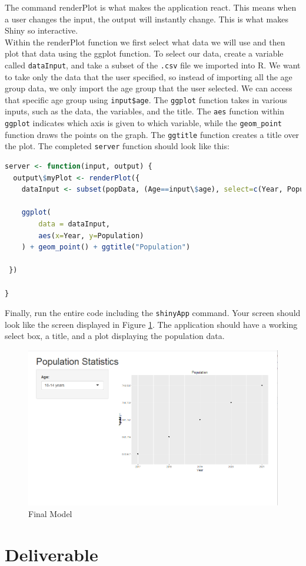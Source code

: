 The command renderPlot is what makes the application react.
This means when a user changes the input, the output will instantly change. This is what makes Shiny so interactive.\\
Within the renderPlot function we first select what data we will use and then plot that data using the ggplot function.
To select our data, create a variable called \texttt{dataInput}, and take a subset of the \texttt{.csv} file we imported into R.
We want to take only the data that the user specified, so instead of importing all the age group data, we only import the age group that the user selected.
We can access that specific age group using \texttt{input\$age}.
The \texttt{ggplot} function takes in various inputs, such as the data, the variables, and the title.
The \texttt{aes} function within \texttt{ggplot} indicates which axis is given to which variable, while the \texttt{geom\_point} function draws the points on the graph.
The \texttt{ggtitle} function creates a title over the plot.
The completed \texttt{server} function should look like this: 
\begin{lstlisting}[language = R]
server <- function(input, output) {
  output\$myPlot <- renderPlot({
    dataInput <- subset(popData, (Age==input\$age), select=c(Year, Population, State))
    
    ggplot(
        data = dataInput, 
        aes(x=Year, y=Population)
    ) + geom_point() + ggtitle("Population")
    
 })
  
}
\end{lstlisting}
Finally, run the entire code including the \texttt{shinyApp} command.
Your screen should look like the screen displayed in Figure \ref{fig:example}.
The application should have a working select box, a title, and a plot displaying the population data.
\begin{figure}[h]
   \centering
   \includegraphics[width = .5\textwidth]{pictures/shiny/pop.PNG} 
   \caption{Final Model}
   \label{fig:example}
\end{figure}

\section{Deliverable}


